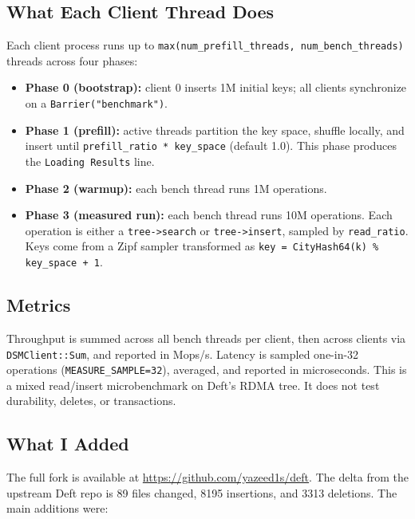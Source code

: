 \documentclass[10pt]{article}
\begin{document}
\subsection{What Each Client Thread Does}

Each client process runs up to \texttt{max(num\_prefill\_threads, num\_bench\_threads)}
threads across four phases:

\begin{itemize}[nosep]
  \item \textbf{Phase 0 (bootstrap):} client 0 inserts 1M initial keys;
    all clients synchronize on a \texttt{Barrier("benchmark")}.
  \item \textbf{Phase 1 (prefill):} active threads partition the key space,
    shuffle locally, and insert until \texttt{prefill\_ratio * key\_space}
    (default 1.0). This phase produces the \texttt{Loading Results} line.
  \item \textbf{Phase 2 (warmup):} each bench thread runs 1M operations.
  \item \textbf{Phase 3 (measured run):} each bench thread runs 10M operations.
    Each operation is either a \texttt{tree->search} or \texttt{tree->insert},
    sampled by \texttt{read\_ratio}.
    Keys come from a Zipf sampler transformed as
    \texttt{key = CityHash64(k) \% key\_space + 1}.
\end{itemize}

\subsection{Metrics}

Throughput is summed across all bench threads per client, then across clients via
\texttt{DSMClient::Sum}, and reported in Mops/s.
Latency is sampled one-in-32 operations (\texttt{MEASURE\_SAMPLE=32}),
averaged, and reported in microseconds.
This is a mixed read/insert microbenchmark on Deft's RDMA tree.
It does not test durability, deletes, or transactions.

\subsection{What I Added}

The full fork is available at \url{https://github.com/yazeed1s/deft}.
The delta from the upstream Deft repo is 89 files changed,
8195 insertions, and 3313 deletions.
The main additions were:
\end{document}
